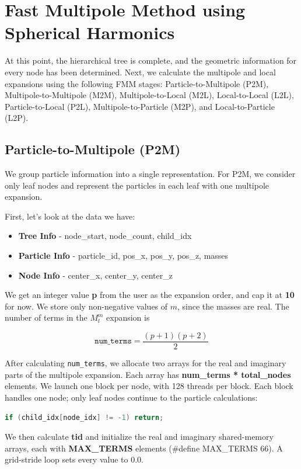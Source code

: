 \section{Fast Multipole Method using Spherical Harmonics}

At this point, the hierarchical tree is complete, and the geometric information for every node has been determined. Next, we calculate the multipole and local expansions using the following FMM stages: Particle-to-Multipole (P2M), Multipole-to-Multipole (M2M), Multipole-to-Local (M2L), Local-to-Local (L2L), Particle-to-Local (P2L), Multipole-to-Particle (M2P), and Local-to-Particle (L2P).

\subsection{Particle-to-Multipole (P2M)}

We group particle information into a single representation. For P2M, we consider only leaf nodes and represent the particles in each leaf with one multipole expansion.

First, let's look at the data we have:
\begin{itemize}
    \item \textbf{Tree Info} - node\_start, node\_count, child\_idx
    \item \textbf{Particle Info} - particle\_id, pos\_x, pos\_y, pos\_z, masses
    \item \textbf{Node Info} - center\_x, center\_y, center\_z
\end{itemize}

We get an integer value \textbf{p} from the user as the expansion order, and cap it at \textbf{10} for now. We store only non-negative values of \(m\), since the masses are real. The number of terms in the \(M_l^m\) expansion is

\[
\texttt{num\_terms} = \frac{(p + 1)(p + 2)}{2}
\]

After calculating \texttt{num\_terms}, we allocate two arrays for the real and imaginary parts of the multipole expansion. Each array has \textbf{num\_terms * total\_nodes} elements. We launch one block per node, with 128 threads per block. Each block handles one node; only leaf nodes continue to the particle calculations:
\begin{lstlisting}[language=C]
    if (child_idx[node_idx] != -1) return;
\end{lstlisting}

We then calculate \textbf{tid} and initialize the real and imaginary shared-memory arrays, each with \textbf{MAX\_TERMS} elements (\#define MAX\_TERMS 66). A grid-stride loop sets every value to 0.0.

